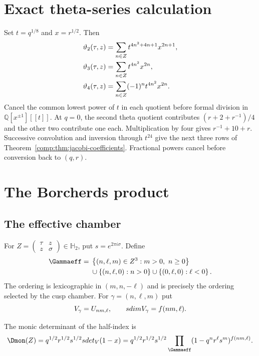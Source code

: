 \section{Exact theta-series calculation}\label{app:theta-computation}
Set $t=q^{1/8}$ and $x=r^{1/2}$. Then
\[
\begin{aligned}
\vartheta_2(\tau,z)&=\sum_{n\in Z}t^{4n^2+4n+1}x^{2n+1},\\
\vartheta_3(\tau,z)&=\sum_{n\in Z}t^{4n^2}x^{2n},\\
\vartheta_4(\tau,z)&=\sum_{n\in Z}(-1)^nt^{4n^2}x^{2n}.
\end{aligned}
\]
Cancel the common lowest power of $t$ in each quotient before
formal division in $\mathbb Q[x^{\pm1}][[t]]$. At $q=0$, the
second theta quotient contributes $(r+2+r^{-1})/4$ and the other
two contribute one each. Multiplication by four gives
$r^{-1}+10+r$. Successive convolution and inversion through
$t^{24}$ give the next three rows of
Theorem~\ref{comp:thm:jacobi-coefficients}. Fractional powers
cancel before conversion back to $(q,r)$.


\section{The Borcherds product}
\subsection{The effective chamber}
For \(Z=\left(\begin{smallmatrix}\tau&z\\z&\sigma\end{smallmatrix}\right)\in\mathbb H_2\),
put \(s=e^{2\pi i\sigma}\). Define
\[
\begin{aligned}
\Gammaeff={}&\set{(n,\ell,m)\in\Z^3:m>0,\ n\ge0}\\
&\cup\set{(n,\ell,0):n>0}
 \cup\set{(0,\ell,0):\ell<0}.
\end{aligned}
\]
The ordering is lexicographic in $(m,n,-\ell)$ and is precisely the ordering selected by the cusp chamber.
For $\gamma=(n,\ell,m)$ put
\[
 V_\gamma=U_{nm,\ell},
 \qquad sdim V_\gamma=f(nm,\ell).
\]

\begin{definition}
The monic determinant of the half-index is
\[
 \Dmon(Z)=q^{1/2}r^{1/2}s^{1/2}
 \sdet_V(1-x)
 =q^{1/2}r^{1/2}s^{1/2}
 \prod_{\Gammaeff}(1-q^nr^\ell s^m)^{f(nm,\ell)}.
\]
\end{definition}

